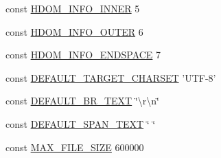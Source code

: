 \begin{DoxyCompactItemize}
\item 
const \hyperlink{simple__html__dom_8php_ab2b42db1e28668502af838f684ca5577}{H\+D\+O\+M\+\_\+\+I\+N\+F\+O\+\_\+\+I\+N\+N\+E\+R} 5
\item 
const \hyperlink{simple__html__dom_8php_a9261ef31b846c2545bd838f76d984938}{H\+D\+O\+M\+\_\+\+I\+N\+F\+O\+\_\+\+O\+U\+T\+E\+R} 6
\item 
const \hyperlink{simple__html__dom_8php_a45cce2cf42d5ed669087cad509c1476c}{H\+D\+O\+M\+\_\+\+I\+N\+F\+O\+\_\+\+E\+N\+D\+S\+P\+A\+C\+E} 7
\item 
const \hyperlink{simple__html__dom_8php_aeb01f6d83a65d695ad327473f838319a}{D\+E\+F\+A\+U\+L\+T\+\_\+\+T\+A\+R\+G\+E\+T\+\_\+\+C\+H\+A\+R\+S\+E\+T} 'U\+T\+F-\/8'
\item 
const \hyperlink{simple__html__dom_8php_a898bdf60fe4d05c1c50013eed5e2c6e8}{D\+E\+F\+A\+U\+L\+T\+\_\+\+B\+R\+\_\+\+T\+E\+X\+T} \char`\"{}\textbackslash{}r\textbackslash{}n\char`\"{}
\item 
const \hyperlink{simple__html__dom_8php_a30d58d7d3a53efc61f064b53a434bafe}{D\+E\+F\+A\+U\+L\+T\+\_\+\+S\+P\+A\+N\+\_\+\+T\+E\+X\+T} \char`\"{} \char`\"{}
\item 
const \hyperlink{simple__html__dom_8php_ae0113eb729c51976f55df15ad1c644c7}{M\+A\+X\+\_\+\+F\+I\+L\+E\+\_\+\+S\+I\+Z\+E} 600000
\end{DoxyCompactItemize}


